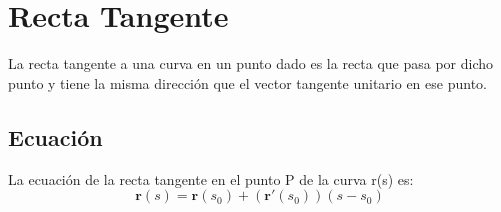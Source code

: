 \documentclass{article} \usepackage[utf8]{inputenc} \usepackage{amsmath}
\begin{document}
	\section{Recta Tangente} La recta tangente a una curva en un punto dado es la recta que pasa por dicho punto y tiene la misma dirección que el vector tangente unitario en ese punto.
	
	\subsection{Ecuación} La ecuación de la recta tangente en el punto 
		P de la curva 
		r(s) es: \begin{equation*} \textbf{r}(s) = \textbf{r}(s_0) + (\textbf{r}'(s_0))(s - s_0) \end{equation*}
	

	
\end{document}
